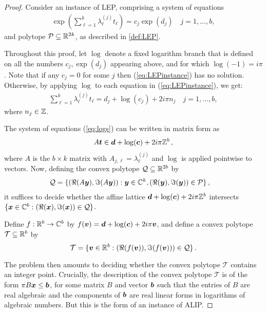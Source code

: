 \begin{proof}
Consider an instance of LEP, comprising a system of equations
\begin{align}
 \exp\left(\sum_{\ell=1}^k \lambda_\ell^{(j)} t_\ell \right) = c_j \exp (d_j)
\quad j=1,\ldots,b,
\label{eq:LEPinstance}
\end{align}
and polytope $\mathcal{P}\subseteq \mathbb{R}^{2k}$, as described in
\cref{def:LEP}.

Throughout this proof, let $\log$ denote a fixed logarithm branch that
is defined on all the numbers $c_j, \exp(d_j)$ appearing
above, and for which $\log(-1) = i \pi$. Note that if any $c_j=0$ for
some $j$ then (\ref{eq:LEPinstance}) has no solution. Otherwise, by
applying $\log$ to each equation in (\ref{eq:LEPinstance}),
we get:
\begin{align}
\sum_{\ell=1}^k \lambda_\ell^{(j)} t_\ell = d_j+\log(c_j) + 2i\pi n_j \quad j=1,\ldots,b,
\label{eq:logs}
\end{align}
where $n_j \in \mathbb{Z}$.

The system of equations (\ref{eq:logs}) can be written in matrix form as
\begin{align*}
A \boldsymbol{t} \in \boldsymbol{d}+\log(\boldsymbol{c}) +
2i\pi \mathbb{Z}^b \, ,
\end{align*}
where $A$ is the $b\times k$ matrix with $A_{j,\ell} = \lambda_\ell^{(j)}$ and $\log$
is applied pointwise to vectors.
Now, defining the convex polytope $\mathcal{Q}\subseteq \mathbb{R}^{2b}$ by
\begin{align*}
\mathcal{Q} = \lbrace &(\Re(A\boldsymbol{y}), \Im(A\boldsymbol{y})) :
\boldsymbol{y}\in\mathbb{C}^k, (\Re(\boldsymbol{y}), \Im(\boldsymbol{y})) \in \mathcal{P} \rbrace \, ,
\end{align*}
it suffices to decide whether the affine lattice
$\boldsymbol{d} + \log(\boldsymbol{c})+ 2i\pi  \mathbb{Z}^b$
intersects
$\lbrace \boldsymbol{x} \in \mathbb{C}^b : (\Re(\boldsymbol{x}),
\Im(\boldsymbol{x})) \in \mathcal{Q} \rbrace$.

Define $f:\mathbb{R}^b \rightarrow \mathbb{C}^b$ by
$f(\boldsymbol{v})= \boldsymbol{d} + \log(\boldsymbol{c}) +
2i\pi \boldsymbol{v}$,
and define a convex polytope $\mathcal{T}\subseteq \mathbb{R}^b$ by
\[\mathcal{T}=\{ \boldsymbol{v}\in\mathbb{R}^b : (\Re(f(\boldsymbol{v})),
\Im (f(\boldsymbol{v}))) \in \mathcal{Q} \} \, . \]

The problem then amounts to deciding whether the convex polytope
$\mathcal{T}$ contains an integer point. Crucially, the
description of the convex polytope $\mathcal{T}$ is of the form
$\pi B\boldsymbol{x} \leq \boldsymbol{b}$, for some matrix $B$ and
vector $\boldsymbol{b}$ such that the entries of $B$ are real
algebraic and the components of $\boldsymbol{b}$ are real linear forms
in logarithms of algebraic numbers.  But this is the form of an
instance of ALIP.
\end{proof}

